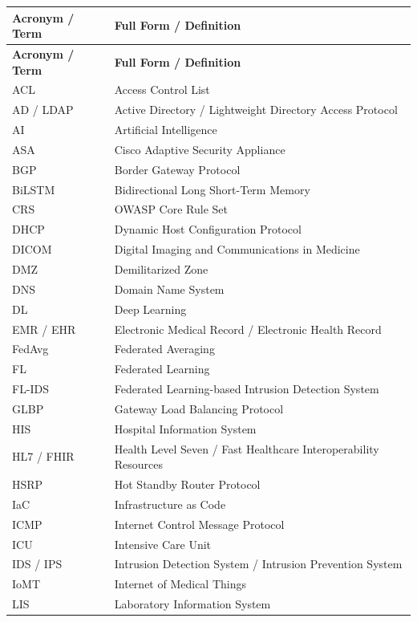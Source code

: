 
\noindent
\begin{longtable}{@{}p{3.4cm}p{10.8cm}@{}}
\toprule
\textbf{Acronym / Term} & \textbf{Full Form / Definition} \\
\midrule
\endfirsthead
\toprule
\textbf{Acronym / Term} & \textbf{Full Form / Definition} \\
\midrule
\endhead
\bottomrule
\endfoot
ACL & Access Control List \\
AD / LDAP & Active Directory / Lightweight Directory Access Protocol \\
AI & Artificial Intelligence \\
ASA & Cisco Adaptive Security Appliance \\
BGP & Border Gateway Protocol \\
BiLSTM & Bidirectional Long Short-Term Memory \\
CRS & OWASP Core Rule Set \\
DHCP & Dynamic Host Configuration Protocol \\
DICOM & Digital Imaging and Communications in Medicine \\
DMZ & Demilitarized Zone \\
DNS & Domain Name System \\
DL & Deep Learning \\
EMR / EHR & Electronic Medical Record / Electronic Health Record \\
FedAvg & Federated Averaging \\
FL & Federated Learning \\
FL-IDS & Federated Learning-based Intrusion Detection System \\
GLBP & Gateway Load Balancing Protocol \\
HIS & Hospital Information System \\
HL7 / FHIR & Health Level Seven / Fast Healthcare Interoperability Resources \\
HSRP & Hot Standby Router Protocol \\
IaC & Infrastructure as Code \\
ICMP & Internet Control Message Protocol \\
ICU & Intensive Care Unit \\
IDS / IPS & Intrusion Detection System / Intrusion Prevention System \\
IoMT & Internet of Medical Things \\
LIS & Laboratory Information System \\

\end{longtable}
